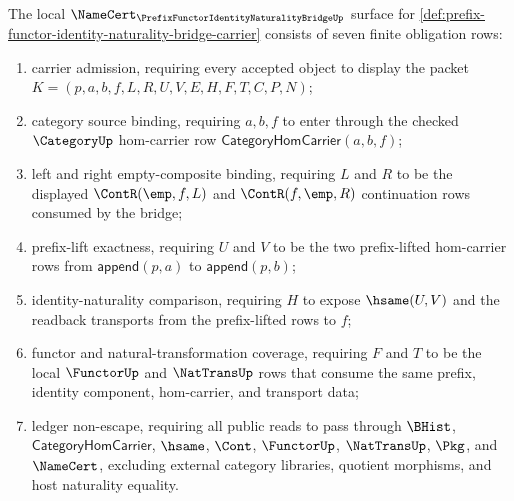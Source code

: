 \begin{theorem}
\label{thm:prefix-functor-identity-naturality-bridge-namecert-obligations}
The local $\NameCert_{\PrefixFunctorIdentityNaturalityBridgeUp}$ surface for \autoref{def:prefix-functor-identity-naturality-bridge-carrier} consists of seven finite obligation rows:
\begin{enumerate}
\item carrier admission, requiring every accepted object to display the packet $K=(p,a,b,f,L,R,U,V,E,H,F,T,C,P,N)$;
\item category source binding, requiring $a,b,f$ to enter through the checked $\CategoryUp$ hom-carrier row $\mathsf{CategoryHomCarrier}(a,b,f)$;
\item left and right empty-composite binding, requiring $L$ and $R$ to be the displayed $\ContR(\emp,f,L)$ and $\ContR(f,\emp,R)$ continuation rows consumed by the bridge;
\item prefix-lift exactness, requiring $U$ and $V$ to be the two prefix-lifted hom-carrier rows from $\mathsf{append}(p,a)$ to $\mathsf{append}(p,b)$;
\item identity-naturality comparison, requiring $H$ to expose $\hsame(U,V)$ and the readback transports from the prefix-lifted rows to $f$;
\item functor and natural-transformation coverage, requiring $F$ and $T$ to be the local $\FunctorUp$ and $\NatTransUp$ rows that consume the same prefix, identity component, hom-carrier, and transport data;
\item ledger non-escape, requiring all public reads to pass through $\BHist$, $\mathsf{CategoryHomCarrier}$, $\hsame$, $\Cont$, $\FunctorUp$, $\NatTransUp$, $\Pkg$, and $\NameCert$, excluding external category libraries, quotient morphisms, and host naturality equality.
\end{enumerate}
\end{theorem}
